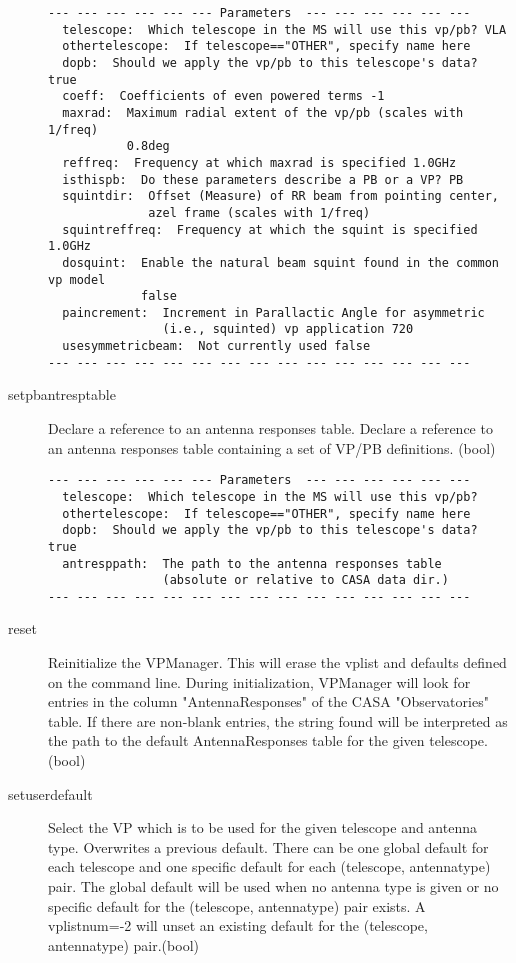 \documentclass[12pt]{article}
\begin{document}
\begin{description}
{\small
\begin{verbatim}
--- --- --- --- --- --- Parameters  --- --- --- --- --- ---
  telescope:  Which telescope in the MS will use this vp/pb? VLA 
  othertelescope:  If telescope=="OTHER", specify name here 
  dopb:  Should we apply the vp/pb to this telescope's data? true 
  coeff:  Coefficients of even powered terms -1 
  maxrad:  Maximum radial extent of the vp/pb (scales with 1/freq) 
           0.8deg 
  reffreq:  Frequency at which maxrad is specified 1.0GHz 
  isthispb:  Do these parameters describe a PB or a VP? PB 
  squintdir:  Offset (Measure) of RR beam from pointing center, 
              azel frame (scales with 1/freq) 
  squintreffreq:  Frequency at which the squint is specified 1.0GHz 
  dosquint:  Enable the natural beam squint found in the common vp model 
             false 
  paincrement:  Increment in Parallactic Angle for asymmetric 
                (i.e., squinted) vp application 720 
  usesymmetricbeam:  Not currently used false 
--- --- --- --- --- --- --- --- --- --- --- --- --- --- ---
\end{verbatim} 
} 


  \item[setpbantresptable]
   Declare a reference to an antenna responses table.
   Declare a reference to an antenna responses table containing a set of VP/PB definitions.
   (bool)
{\small
\begin{verbatim}
--- --- --- --- --- --- Parameters  --- --- --- --- --- ---
  telescope:  Which telescope in the MS will use this vp/pb? 
  othertelescope:  If telescope=="OTHER", specify name here 
  dopb:  Should we apply the vp/pb to this telescope's data? true 
  antresppath:  The path to the antenna responses table 
                (absolute or relative to CASA data dir.) 
--- --- --- --- --- --- --- --- --- --- --- --- --- --- ---
\end{verbatim} 
} 


  \item[reset]
   Reinitialize the VPManager. This will erase the vplist and defaults defined on the command line.
   During initialization, VPManager will look for entries in the column "AntennaResponses"
   of the CASA "Observatories" table. If there are non-blank entries, the string found will be
   interpreted as the path to the default AntennaResponses table for the given telescope. 
   (bool)

  \item[setuserdefault]
   Select the VP which is to be used for the given telescope and antenna type.
   Overwrites a previous default. 
   There can be one global default for each telescope and one specific default
   for each (telescope, antennatype) pair. The global default will be used when
   no antenna type is given or no specific default for the (telescope, antennatype) 
   pair exists. A vplistnum=-2 will unset an existing default for the 
   (telescope, antennatype) pair.(bool)


\end{description}
\end{document}
